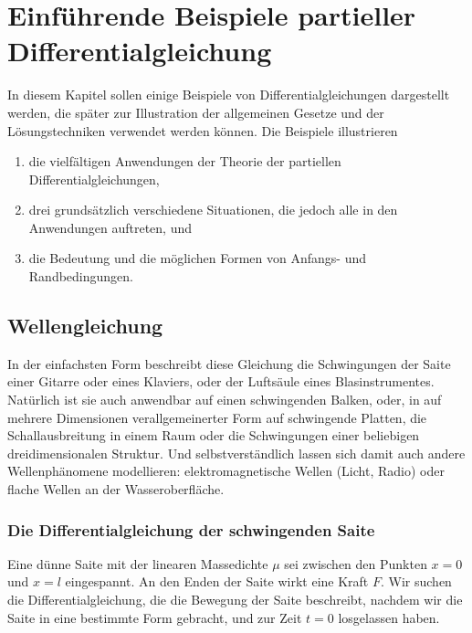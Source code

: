%
%
%
\chapter{Einführende Beispiele partieller Differentialgleichung\label{chapter-beispiele}}
In diesem Kapitel sollen einige Beispiele von Differentialgleichungen
dargestellt werden, die später zur Illustration der allgemeinen
Gesetze und der Lösungstechniken verwendet werden können.
Die Beispiele illustrieren
\begin{enumerate}
\item die vielfältigen Anwendungen der Theorie der partiellen 
Differentialgleichungen,
\item drei grundsätzlich verschiedene
Situationen, die jedoch alle in den Anwendungen auftreten, und
\item die Bedeutung und die möglichen Formen von Anfangs-
und Randbedingungen.
\end{enumerate}

\section{Wellengleichung\label{beispiele:wellengleichung}}
In der einfachsten Form beschreibt diese Gleichung die Schwingungen der
Saite einer Gitarre oder eines Klaviers, oder der Luftsäule eines
Blasinstrumentes.
Natürlich ist sie auch anwendbar auf einen schwingenden
Balken, oder, in auf mehrere Dimensionen verallgemeinerter Form auf
schwingende Platten, die Schallausbreitung in einem Raum oder die Schwingungen
einer beliebigen dreidimensionalen Struktur.
Und selbstverständlich
lassen sich damit auch andere Wellen\-phä\-no\-mene modellieren:
elektromagnetische Wellen (Licht, Radio) oder flache Wellen an der
Wasseroberfläche.

\subsection{Die Differentialgleichung der schwingenden Saite\label{beispiele:schingende-saite}}
Eine dünne Saite mit der linearen Massedichte $\mu$ sei zwischen den
Punkten $x=0$ und $x=l$ eingespannt. An den Enden der Saite wirkt eine
Kraft $F$. Wir suchen die Differentialgleichung, die die Bewegung der Saite
beschreibt, nachdem wir die Saite in eine bestimmte Form gebracht, und
zur Zeit $t=0$ losgelassen haben.


